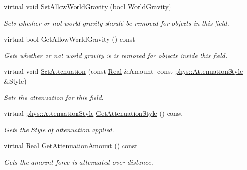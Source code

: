 \begin{DoxyCompactItemize}
virtual void \hyperlink{classphys_1_1GravityWell_a1dc68391835134835a9969ed823a0b81}{SetAllowWorldGravity} (bool WorldGravity)
\begin{DoxyCompactList}\small\item\em Sets whether or not world gravity should be removed for objects in this field. \item\end{DoxyCompactList}\item 
virtual bool \hyperlink{classphys_1_1GravityWell_ac79932786951304c794ff118307aa9c0}{GetAllowWorldGravity} () const 
\begin{DoxyCompactList}\small\item\em Gets whether or not world gravity is is removed for objects inside this field. \item\end{DoxyCompactList}\item 
virtual void \hyperlink{classphys_1_1GravityWell_a0d3b34c032e1f0af0ddc1293364d3001}{SetAttenuation} (const \hyperlink{namespacephys_af7eb897198d265b8e868f45240230d5f}{Real} \&Amount, const \hyperlink{namespacephys_ad4ce7ee5c1cc164f2ea3d5f28211739f}{phys::AttenuationStyle} \&Style)
\begin{DoxyCompactList}\small\item\em Sets the attenuation for this field. \item\end{DoxyCompactList}\item 
virtual \hyperlink{namespacephys_ad4ce7ee5c1cc164f2ea3d5f28211739f}{phys::AttenuationStyle} \hyperlink{classphys_1_1GravityWell_abd3352779acc58e3a1e6aa1e2b495580}{GetAttenuationStyle} () const 
\begin{DoxyCompactList}\small\item\em Gets the Style of attenuation applied. \item\end{DoxyCompactList}\item 
virtual \hyperlink{namespacephys_af7eb897198d265b8e868f45240230d5f}{Real} \hyperlink{classphys_1_1GravityWell_aab54a6814742fab740132461ff424472}{GetAttenuationAmount} () const 
\begin{DoxyCompactList}\small\item\em Gets the amount force is attenuated over distance. \item\end{DoxyCompactList}\end{DoxyCompactItemize}
